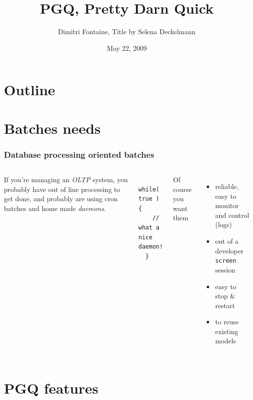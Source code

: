 \documentclass{beamer}
\title{PGQ, Pretty Darn Quick}
\author{Dimitri Fontaine, Title by Selena Deckelmann}
\date{May 22, 2009}
\begin{document}
\frame{\titlepage}

\section*{Outline}

\section{Batches needs}

\begin{frame}[fragile]
  \frametitle{Database processing oriented batches}

\begin{columns}[c]


If you're managing an \textit{OLTP} system, you probably have out of line
processing to get done, and probably are using cron batches and home made
\textit{daemons}.

\pause
\begin{example}
\begin{verbatim}
  while( true ) {
    // what a nice daemon!
  }
\end{verbatim}
\end{example}

\pause
{} 
  Of course you want them 
  \begin{itemize}
   \item<3-> reliable, easy to monitor and control (logs)
   \item<4-> out of a developer \texttt{screen} session
   \item<5-> easy to stop \& restart
   \item<6-> to reuse existing models
  \end{itemize}

\end{columns}
\end{frame}

\section{PGQ features}

\end{document}
